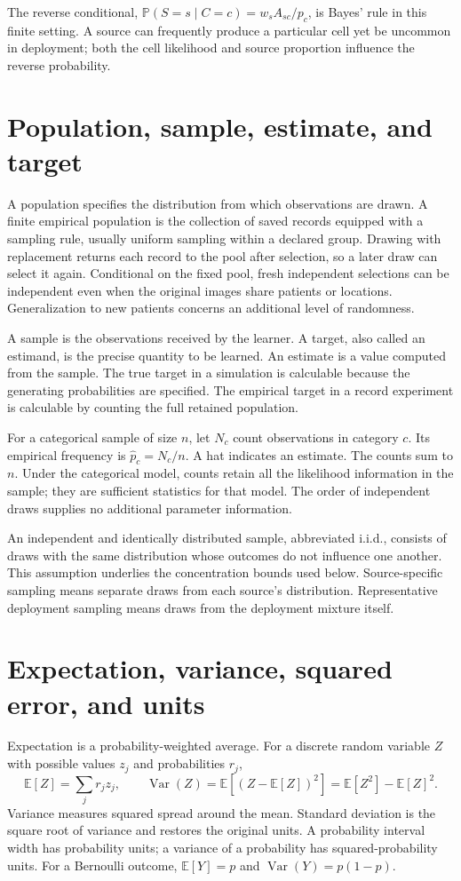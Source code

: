 \documentclass[11pt,a4paper]{report}
\newcommand{\E}{\mathbb E}
\newcommand{\Prob}{\mathbb P}
\newcommand{\Var}{\operatorname{Var}}
\begin{document}
The reverse conditional, $\Prob(S=s\mid C=c)=w_sA_{sc}/p_c$, is Bayes' rule in this finite setting. A source can frequently produce a particular cell yet be uncommon in deployment; both the cell likelihood and source proportion influence the reverse probability.

\section{Population, sample, estimate, and target}
A population specifies the distribution from which observations are drawn. A finite empirical population is the collection of saved records equipped with a sampling rule, usually uniform sampling within a declared group. Drawing with replacement returns each record to the pool after selection, so a later draw can select it again. Conditional on the fixed pool, fresh independent selections can be independent even when the original images share patients or locations. Generalization to new patients concerns an additional level of randomness.

A sample is the observations received by the learner. A target, also called an estimand, is the precise quantity to be learned. An estimate is a value computed from the sample. The true target in a simulation is calculable because the generating probabilities are specified. The empirical target in a record experiment is calculable by counting the full retained population.

For a categorical sample of size $n$, let $N_c$ count observations in category $c$. Its empirical frequency is $\widehat p_c=N_c/n$. A hat indicates an estimate. The counts sum to $n$. Under the categorical model, counts retain all the likelihood information in the sample; they are sufficient statistics for that model. The order of independent draws supplies no additional parameter information.

An independent and identically distributed sample, abbreviated i.i.d., consists of draws with the same distribution whose outcomes do not influence one another. This assumption underlies the concentration bounds used below. Source-specific sampling means separate draws from each source's distribution. Representative deployment sampling means draws from the deployment mixture itself.

\section{Expectation, variance, squared error, and units}
Expectation is a probability-weighted average. For a discrete random variable $Z$ with possible values $z_j$ and probabilities $r_j$,
\begin{equation}
\E[Z]=\sum_j r_jz_j,\qquad
\Var(Z)=\E[(Z-\E[Z])^2]=\E[Z^2]-\E[Z]^2.
\end{equation}
Variance measures squared spread around the mean. Standard deviation is the square root of variance and restores the original units. A probability interval width has probability units; a variance of a probability has squared-probability units. For a Bernoulli outcome, $\E[Y]=p$ and $\Var(Y)=p(1-p)$.
\end{document}
